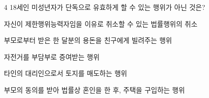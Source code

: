 \begin{question}{4}
18세인 미성년자가 단독으로 유효하게 할 수 있는 행위가 아닌 것은?
\begin{choices}
  \item 자신이 제한행위능력자임을 이유로 취소할 수 있는 법률행위의 취소
  \item 부모로부터 받은 한 달분의 용돈을 친구에게 빌려주는 행위
  \item 자전거를 부담부로 증여받는 행위
  \item 타인의 대리인으로서 토지를 매도하는 행위
  \item 부모의 동의를 받아 법률상 혼인을 한 후, 주택을 구입하는 행위
\end{choices}
\end{question}
